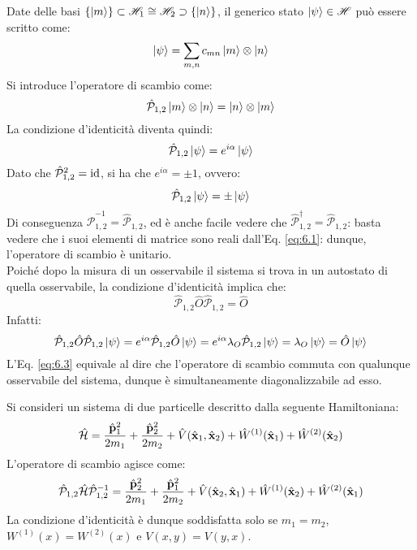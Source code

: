 Date delle basi $ \{\ket{m}\} \subset \mathscr{H}_1 \cong \mathscr{H}_2 \supset \{\ket{n}\} $, il generico stato $ \ket{\psi} \in \mathscr{H} $ può essere scritto come:
\begin{equation*}
	\ket{\psi} = \sum_{m,n} c_{mn} \ket{m} \otimes \ket{n}
\end{equation*}
Si introduce l'operatore di scambio come:
\begin{equation}
	\hat{\mathcal{P}}_{1,2} \ket{m} \otimes \ket{n} = \ket{n} \otimes \ket{m}
	\label{eq:6.1}
\end{equation}
La condizione d'identicità diventa quindi:
\begin{equation*}
	\hat{\mathcal{P}}_{1,2} \ket{\psi} = e^{i \alpha} \ket{\psi}
\end{equation*}
Dato che $ \hat{\mathcal{P}}_{1,2}^2 = \operatorname{id} $, si ha che $ e^{i \alpha} = \pm 1 $, ovvero:
\begin{equation}
	\hat{\mathcal{P}}_{1,2} \ket{\psi} = \pm \ket{\psi}
	\label{eq:6.2}
\end{equation}
Di conseguenza $ \hat{\mathcal{P}}_{1,2}^{-1} = \hat{\mathcal{P}}_{1,2} $, ed è anche facile vedere che $ \hat{\mathcal{P}}_{1,2}^\dagger = \hat{\mathcal{P}}_{1,2} $: basta vedere che i suoi elementi di matrice sono reali dall'Eq. \ref{eq:6.1}: dunque, l'operatore di scambio è unitario.\\
Poiché dopo la misura di un osservabile il sistema si trova in un autostato di quella osservabile, la condizione d'identicità implica che:
\begin{equation}
	\hat{\mathcal{P}}_{1,2} \hat{O} \hat{\mathcal{P}}_{1,2} = \hat{O}
	\label{eq:6.3}
\end{equation}
Infatti:
\begin{equation*}
	\hat{\mathcal{P}}_{1,2} \hat{O} \hat{\mathcal{P}}_{1,2} \ket{\psi} = e^{i \alpha} \hat{\mathcal{P}}_{1,2} \hat{O} \ket{\psi} = e^{i \alpha} \lambda_O \hat{\mathcal{P}}_{1,2} \ket{\psi} = \lambda_O \ket{\psi} = \hat{O} \ket{\psi}
\end{equation*}
L'Eq. \ref{eq:6.3} equivale al dire che l'operatore di scambio commuta con qualunque osservabile del sistema, dunque è simultaneamente diagonalizzabile ad esso.

\begin{example}
	Si consideri un sistema di due particelle descritto dalla seguente Hamiltoniana:
	\begin{equation*}
		\hat{\mathcal{H}} = \frac{\hat{\mathbf{p}}_1^2}{2m_1} + \frac{\hat{\mathbf{p}}_2^2}{2m_2} + \hat{V}(\hat{\mathbf{x}}_1, \hat{\mathbf{x}}_2) + \hat{W}^{(1)}(\hat{\mathbf{x}}_1) + \hat{W}^{(2)}(\hat{\mathbf{x}}_2)
	\end{equation*}
	L'operatore di scambio agisce come:
	\begin{equation*}
		\hat{\mathcal{P}}_{1,2} \hat{\mathcal{H}} \hat{\mathcal{P}}_{1,2}^{-1} = \frac{\hat{\mathbf{p}}_2^2}{2m_1} + \frac{\hat{\mathbf{p}}_1^2}{2m_2} + \hat{V}(\hat{\mathbf{x}}_2, \hat{\mathbf{x}}_1) + \hat{W}^{(1)}(\hat{\mathbf{x}}_2) + \hat{W}^{(2)}(\hat{\mathbf{x}}_1)
	\end{equation*}
	La condizione d'identicità è dunque soddisfatta solo se $ m_1 = m_2 $, $ W^{(1)}(x) = W^{(2)}(x) $ e $ V(x,y) = V(y,x) $.
\end{example}

